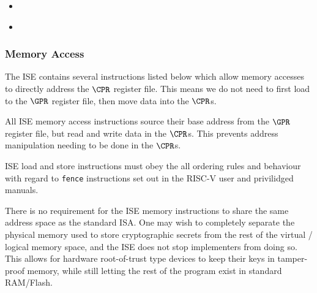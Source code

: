 {\iencltump}
{
}{
\begin{itemize}
\item {}
\end{itemize}
}{}

{\iencgtump}
{
}{
\begin{itemize}
\item {}
\end{itemize}
}{}


\subsubsection{Memory Access}
\label{sec:memory-instructions}

The ISE contains several instructions listed below which allow memory
accesses to directly address the $\CPR$ register file. This means we do
not need to first load to the $\GPR$ register file, then move data into
the $\CPR$s.

All ISE memory access instructions source their base address from the
$\GPR$ register file, but read and write data in the $\CPR$s. This
prevents address manipulation needing to be done in the $\CPR$s.

ISE load and store instructions must obey the all ordering rules and
behaviour with regard to {\tt fence} instructions set out in the
RISC-V user and privilidged manuals.

There is no requirement for the ISE memory instructions to share the same
address space as the standard ISA. One may wish to completely separate
the physical memory used to store cryptographic secrets from the rest of
the virtual / logical memory space, and the ISE does not stop implementers
from doing so. This allows for hardware root-of-trust type devices to keep
their keys in tamper-proof memory, while still letting the rest of the
program exist in standard RAM/Flash.

